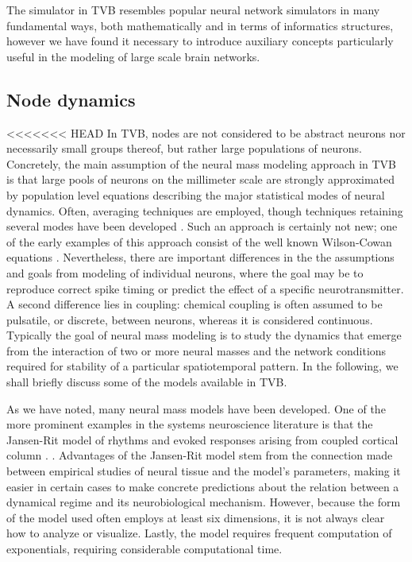 The simulator in TVB resembles popular neural network simulators in 
many fundamental ways, both mathematically and in terms of informatics 
structures, however we have found it necessary to introduce auxiliary
concepts particularly useful in the modeling of large scale brain 
networks.



\subsection{Node dynamics}

<<<<<<< HEAD
	In TVB, nodes are not considered to be abstract neurons nor necessarily 
	small groups thereof, but rather large populations of neurons. Concretely, 
	the main assumption of the neural mass modeling approach in TVB is that
	large pools of neurons on the millimeter scale are strongly approximated
	by population level equations describing the major statistical modes of 
	neural dynamics. Often, averaging techniques are employed, though techniques
	retaining several modes have been developed \cite{Stefanescu_2011}.
	Such an approach is certainly not new; one of the early
	examples of this approach consist of the well known Wilson-Cowan equations
	\cite{Wilson_1973}. Nevertheless, there are important differences in the
	the assumptions and goals from modeling of individual neurons, where the
	goal may be to reproduce correct spike timing or predict the effect of 
	a specific neurotransmitter. A second difference lies in coupling:
	chemical coupling is often assumed to be pulsatile, or discrete, between neurons, whereas
	it is considered continuous.
	Typically the goal of neural mass modeling
	is to study the dynamics that emerge from the interaction of two
	or more neural masses and the network conditions required for stability
	of a particular spatiotemporal pattern. In the following, we shall 
	briefly discuss some of the models available in TVB.

	As we have noted, many neural mass models have been developed. One of
	the more prominent examples in the systems neuroscience literature is 
	that the Jansen-Rit model of rhythms and evoked responses arising from
	coupled cortical column \cite{Jansen_1995}. 
	.
	Advantages of the Jansen-Rit model stem from the connection made
	between empirical studies of neural tissue and the model's parameters, 
	making it easier in certain cases to make concrete predictions about
	the relation between a dynamical regime and its neurobiological 
	mechanism. However, because the form of the model used often employs
	at least six dimensions, it is not always clear how to analyze or
	visualize. Lastly, the model requires frequent computation of exponentials,
	requiring considerable computational time. 

